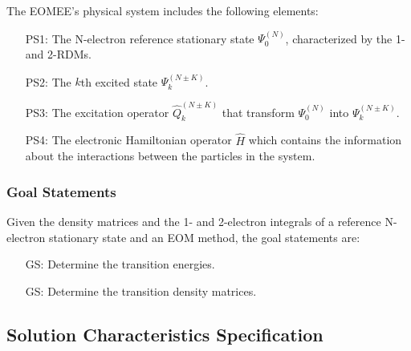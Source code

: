 \documentclass[12pt]{article}
\newcounter{goalnum} %
\begin{document}
The EOMEE's physical system includes the following elements:

\begin{itemize}

\item[PS1:] The N-electron reference stationary state $\Psi^{(N)}_0$, 
characterized by the 1- and 2-RDMs.

\item[PS2:] The $k$th excited state $\Psi^{(N \pm K)}_k$.

\item[PS3:] The excitation operator $\hat{Q}^{(N \pm K)}_k$ that transform 
$\Psi^{(N)}_0$ into $\Psi^{(N \pm K)}_k$.

\item[PS4:] The electronic Hamiltonian operator $\hat{H}$ which contains the 
information about the interactions between the particles in the system.

\end{itemize}



\subsubsection{Goal Statements}

\noindent Given the density matrices and the 1- and 2-electron integrals of a 
reference N-electron stationary state and an EOM method, the goal statements 
are:

\begin{itemize}

\item[GS\refstepcounter{goalnum}\thegoalnum \label{GS:energy}:] Determine the 
transition energies.
\item[GS\refstepcounter{goalnum}\thegoalnum \label{GS:tdms}:] Determine the 
transition density matrices.

\end{itemize}

\subsection{Solution Characteristics Specification}
\end{document}
